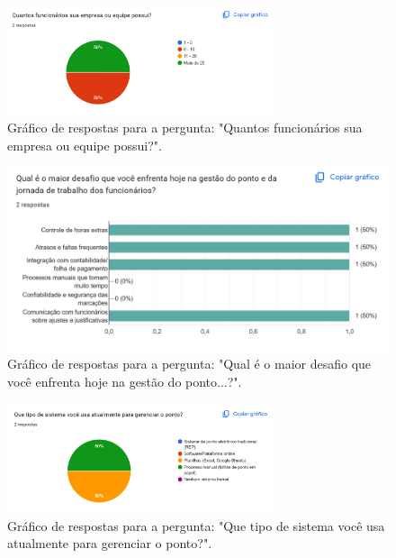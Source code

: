 \begin{apendicesenv}
\begin{figure}[h!]
  \centering
  \includegraphics[width=0.7\textwidth]{imagens/quantidade-funcionarios.png}
  \caption{Gráfico de respostas para a pergunta: "Quantos funcionários sua empresa ou equipe possui?".}
  \label{fig:resp-gestor-funcionarios}
\end{figure}

\begin{figure}[h!]
  \centering
  \includegraphics[width=1\textwidth]{imagens/imagem-desafios.png}
  \caption{Gráfico de respostas para a pergunta: "Qual é o maior desafio que você enfrenta hoje na gestão do ponto...?".}
  \label{fig:resp-gestor-desafios}
\end{figure}

\begin{figure}[h!]
  \centering
  \includegraphics[width=0.7\textwidth]{imagens/imagem_sistema_atual.png}
  \caption{Gráfico de respostas para a pergunta: "Que tipo de sistema você usa atualmente para gerenciar o ponto?".}
  \label{fig:resp-gestor-sistema-atual}
\end{figure}


\end{apendicesenv}
